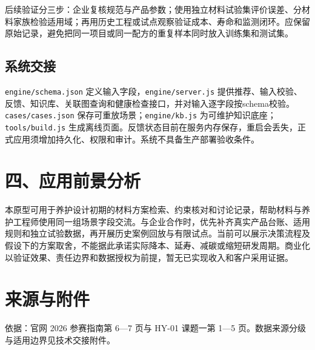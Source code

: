 \documentclass[UTF8,fontset=none,zihao=-4,a4paper]{ctexart}
\begin{document}
后续验证分三步：企业复核规范与产品参数；使用独立材料试验集评价误差、分材料家族检验适用域；再用历史工程或试点观察验证成本、寿命和监测闭环。应保留原始记录，避免把同一项目或同一配方的重复样本同时放入训练集和测试集。

\subsection*{系统交接}
\texttt{engine/\allowbreak{}schema.\allowbreak{}json} 定义输入字段，\texttt{engine/\allowbreak{}server.\allowbreak{}js} 提供推荐、输入校验、反馈、知识库、关联图查询和健康检查接口，并对输入逐字段按schema校验。\texttt{cases/\allowbreak{}cases.\allowbreak{}json} 保存可重放场景；\texttt{engine/\allowbreak{}kb.\allowbreak{}js} 为可维护知识底座；\texttt{tools/\allowbreak{}build.\allowbreak{}js} 生成离线页面。反馈状态目前在服务内存保存，重启会丢失，正式应用须增加持久化、权限和审计。系统不具备生产部署验收条件。

\section*{四、应用前景分析}
本原型可用于养护设计初期的材料方案检索、约束核对和讨论记录，帮助材料与养护工程师使用同一组场景字段交流。与企业合作时，优先补齐真实产品台账、适用规则和独立试验数据，再开展历史案例回放与有限试点。当前可以展示决策流程及假设下的方案取舍，不能据此承诺实际降本、延寿、减碳或缩短研发周期。商业化以验证效果、责任边界和数据授权为前提，暂无已实现收入和客户采用证据。

\section*{来源与附件}
依据：官网 2026 参赛指南第 6—7 页与 HY-01 课题一第 1—5 页。数据来源分级与适用边界见技术交接附件。
\end{document}
